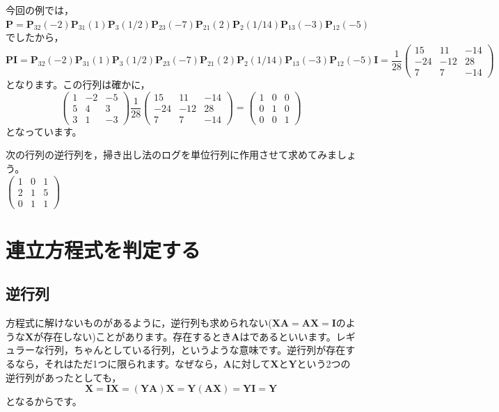 \documentclass{ltjsbook}
\begin{document}
今回の例では，$\bm{P} =\bm{P}_{32}(-2)\bm{P}_{31}(1)\bm{P}_{3}(1/2)\bm{P}_{23}(-7)\bm{P}_{21}(2)\bm{P}_{2}(1/14)\bm{P}_{13}(-3)\bm{P}_{12}(-5)$でしたから，
\[ \bm{PI} = \bm{P}_{32}(-2)\bm{P}_{31}(1)\bm{P}_{3}(1/2)\bm{P}_{23}(-7)\bm{P}_{21}(2)\bm{P}_{2}(1/14)\bm{P}_{13}(-3)\bm{P}_{12}(-5)\bm{I} =\frac{1}{28}\begin{pmatrix}15&11&-14\\-24&-12&28\\7&7&-14\end{pmatrix}\]
となります。この行列は確かに，
\[ \begin{pmatrix}1&-2&-5\\5&4&3\\3&1&-3\end{pmatrix}\frac{1}{28}\begin{pmatrix}15&11&-14\\-24&-12&28\\7&7&-14\end{pmatrix} = \begin{pmatrix}1 & 0 & 0\\0 & 1 & 0 \\0 & 0 & 1\end{pmatrix}\]
となっています。
\begin{reidai}{}{}
	次の行列の逆行列を，掃き出し法のログを単位行列に作用させて求めてみましょう。\\
	$\begin{pmatrix}1&0&1\\2&1&5\\0&1&1\end{pmatrix}$
\end{reidai}
\section{連立方程式を判定する}
\subsection{逆行列}
方程式に解けないものがあるように，逆行列も求められない($\bm{XA}=\bm{AX}=\bm{I}$のような$\bm{X}$が存在しない)ことがあります。存在するとき$\bm{A}$はであるといいます。レギュラーな行列，ちゃんとしている行列，というような意味です。逆行列が存在するなら，それはただ1つに限られます。なぜなら，$\bm{A}$に対して$\bm{X}$と$\bm{Y}$という2つの逆行列があったとしても，
\[ \bm{X} = \bm{IX} = (\bm{YA})\bm{X} = \bm{Y}(\bm{AX}) = \bm{YI} = \bm{Y} \]
となるからです。
\end{document}
